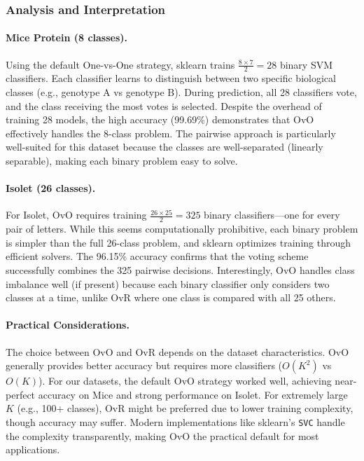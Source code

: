 \documentclass[12pt]{article}
\begin{document}
\subsubsection{Analysis and Interpretation}

\paragraph{Mice Protein (8 classes).} Using the default One-vs-One strategy, sklearn trains $\frac{8 \times 7}{2} = 28$ binary SVM classifiers. Each classifier learns to distinguish between two specific biological classes (e.g., genotype A vs genotype B). During prediction, all 28 classifiers vote, and the class receiving the most votes is selected. Despite the overhead of training 28 models, the high accuracy (99.69\%) demonstrates that OvO effectively handles the 8-class problem. The pairwise approach is particularly well-suited for this dataset because the classes are well-separated (linearly separable), making each binary problem easy to solve.

\paragraph{Isolet (26 classes).} For Isolet, OvO requires training $\frac{26 \times 25}{2} = 325$ binary classifiers—one for every pair of letters. While this seems computationally prohibitive, each binary problem is simpler than the full 26-class problem, and sklearn optimizes training through efficient solvers. The 96.15\% accuracy confirms that the voting scheme successfully combines the 325 pairwise decisions. Interestingly, OvO handles class imbalance well (if present) because each binary classifier only considers two classes at a time, unlike OvR where one class is compared with all 25 others.

\paragraph{Practical Considerations.} The choice between OvO and OvR depends on the dataset characteristics. OvO generally provides better accuracy but requires more classifiers ($O(K^2)$ vs $O(K)$). For our datasets, the default OvO strategy worked well, achieving near-perfect accuracy on Mice and strong performance on Isolet. For extremely large $K$ (e.g., 100+ classes), OvR might be preferred due to lower training complexity, though accuracy may suffer. Modern implementations like sklearn's \texttt{SVC} handle the complexity transparently, making OvO the practical default for most applications.
\end{document}
